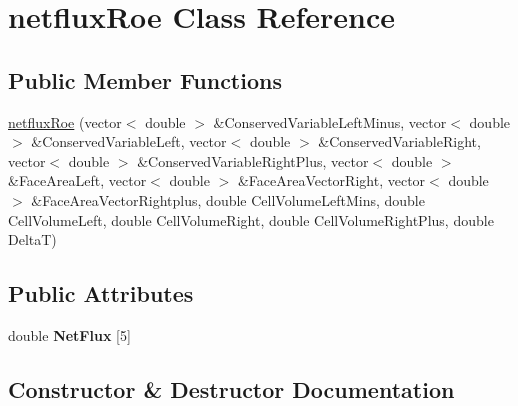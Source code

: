 \hypertarget{classnetfluxRoe}{}\section{netflux\+Roe Class Reference}
\label{classnetfluxRoe}
\subsection*{Public Member Functions}
\begin{DoxyCompactItemize}
\item 
\hyperlink{classnetfluxRoe_a290b1e4650c4ee185da9cd80ddb5b4f9}{netflux\+Roe} (vector$<$ double $>$ \&Conserved\+Variable\+Left\+Minus, vector$<$ double $>$ \&Conserved\+Variable\+Left, vector$<$ double $>$ \&Conserved\+Variable\+Right, vector$<$ double $>$ \&Conserved\+Variable\+Right\+Plus, vector$<$ double $>$ \&Face\+Area\+Left, vector$<$ double $>$ \&Face\+Area\+Vector\+Right, vector$<$ double $>$ \&Face\+Area\+Vector\+Rightplus, double Cell\+Volume\+Left\+Mins, double Cell\+Volume\+Left, double Cell\+Volume\+Right, double Cell\+Volume\+Right\+Plus, double DeltaT)
\end{DoxyCompactItemize}
\subsection*{Public Attributes}
\begin{DoxyCompactItemize}
\item 
double {\bfseries Net\+Flux} \mbox{[}5\mbox{]}\hypertarget{classnetfluxRoe_a30d62acdaf691658966dedfc193a6592}{}\label{classnetfluxRoe_a30d62acdaf691658966dedfc193a6592}

\end{DoxyCompactItemize}


\subsection{Constructor \& Destructor Documentation}
